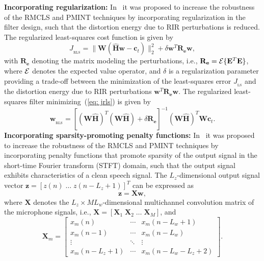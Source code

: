 \documentclass[fleqn]{aes2e}
\begin{document}
\vskip 2pt
\textbf{Incorporating regularization:} \enspace
In~\cite{Kodrasi_ITASLP_2013} it was proposed to increase the robustness of the RMCLS and PMINT techniques by incorporating regularization in the filter design, such that the distortion energy due to RIR perturbations is reduced.
The regularized least-squares cost function is given by
\begin{equation}
\label{eq: jrls}
J_{_{\text{RLS}}} = \|\mathbf{W} (\hat{\mathbf{H}}\mathbf{w} - \mathbf{c}_t) \|_2^2 + \delta \mathbf{w}^T\mathbf{R}_{\mathbf{e}}\mathbf{w},
\end{equation}
with $\mathbf{R}_{\mathbf{e}}$ denoting the matrix modeling the perturbations, i.e., $\mathbf{R}_{\mathbf{e}} = {\cal{E}} \{\mathbf{E}^T\mathbf{E} \}$, where ${\cal{E}}$ denotes the expected value operator, and $\delta$ is a regularization parameter providing a trade-off between the minimization of the least-squares error $J_{_{\text{LS}}}$ and the distortion energy due to RIR perturbations $\mathbf{w}^T\mathbf{R}_{\mathbf{e}}\mathbf{w}$.
The regularized least-squares filter minimizing~(\ref{eq: jrls}) is given by
\begin{equation}
\label{eq: w_rls}
\mathbf{w}_{_{\text{RLS}}} = [ (\mathbf{W}\hat{\mathbf{H}})^T(\mathbf{W}\hat{\mathbf{H}})+\delta \mathbf{R}_{\mathbf{e}} ]^{-1}(\mathbf{W}\hat{\mathbf{H}})^T\mathbf{W}\mathbf{c}_t.
\end{equation}
\vskip 2pt
\textbf{Incorporating sparsity-promoting penalty functions:} \enspace In~\cite{Kodrasi_ICASSP_2016,Kodrasi_ITASLP_2016b} it was proposed to increase the robustness of the RMCLS and PMINT techniques by incorporating penalty functions that promote sparsity of the output signal in the short-time Fourier transform (STFT) domain, such that the output signal exhibits characteristics of a clean speech signal.
The $L_z$-dimensional output signal vector $\mathbf{z} = [z(n) \; \ldots \; z(n-L_z+1)]^T$ can be expressed as
\begin{equation}
\mathbf{z} = \mathbf{X}\mathbf{w},
\end{equation}
where $\mathbf{X}$ denotes the $L_z \times ML_w$-dimensional multichannel convolution matrix of the microphone signals, i.e., $ \mathbf{X} = [\mathbf{X}_1 \; \mathbf{X}_2 \; \ldots \; \mathbf{X}_M]$, and
\begin{equation}
\mathbf{X}_m = \begin{bmatrix}
    x_m(n) &   \cdots & x_m(n-L_w+ 1) \\
    x_m(n-1) & \cdots & x_m(n-L_w) \\
    \vdots & \ddots & \vdots \\
    x_m(n-L_z+1) & \cdots & x_m(n-L_w-L_z+2)
   \end{bmatrix}\!\!\!.\!\!\!
 \end{equation}
\end{document}
